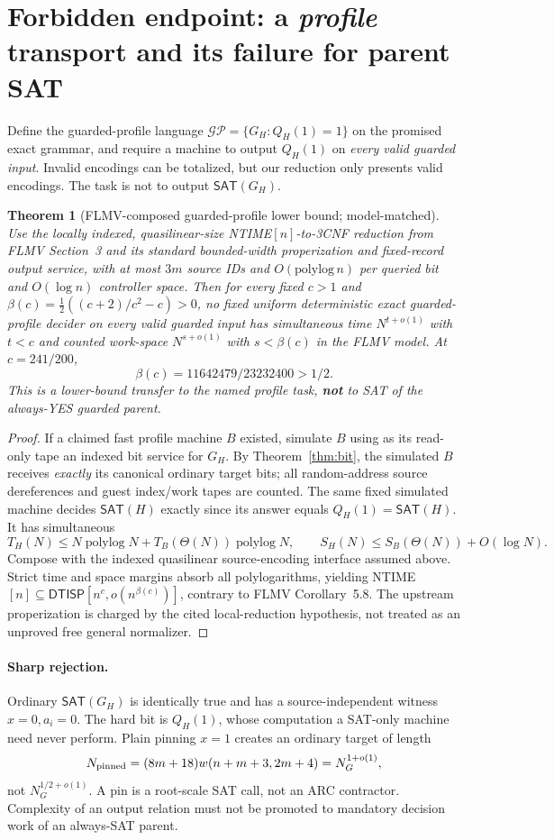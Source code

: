 \documentclass[11pt]{article}
\newtheorem{theorem}{Theorem}
\newcommand{\SAT}{\mathsf{SAT}}
\newcommand{\DTISP}{\mathsf{DTISP}}
\begin{document}
\section{Forbidden endpoint: a \emph{profile} transport and its failure for parent SAT}
Define the guarded-profile language $\mathcal{GP}=\{G_H:Q_H(1)=1\}$ on the promised exact grammar, and require a machine to output $Q_H(1)$ on \emph{every valid guarded input}. Invalid encodings can be totalized, but our reduction only presents valid encodings. The task is not to output $\SAT(G_H)$.
\begin{theorem}[FLMV-composed guarded-profile lower bound; model-matched]\label{thm:flmv}
Use the locally indexed, quasilinear-size NTIME$[n]$-to-3CNF reduction from FLMV Section~3 and its standard bounded-width properization and fixed-record output service, with at most $3m$ source IDs and $O(\mathrm{polylog}\,n)$ per queried bit and $O(\log n)$ controller space. Then for every fixed $c>1$ and $\beta(c)=\frac12((c+2)/c^2-c)>0$, no fixed uniform deterministic exact \emph{guarded-profile} decider on every valid guarded input has simultaneous time $N^{t+o(1)}$ with $t<c$ and counted work-space $N^{s+o(1)}$ with $s<\beta(c)$ in the FLMV model. At $c=241/200$,
\[
\beta(c)=11642479/23232400>1/2.
\]
This is a lower-bound transfer to the named profile task, \textbf{not} to SAT of the always-YES guarded parent.
\end{theorem}
\begin{proof}
If a claimed fast profile machine $B$ existed, simulate $B$ using as its read-only tape an indexed bit service for $G_H$. By Theorem~\ref{thm:bit}, the simulated $B$ receives \emph{exactly} its canonical ordinary target bits; all random-address source dereferences and guest index/work tapes are counted. The same fixed simulated machine decides $\SAT(H)$ exactly since its answer equals $Q_H(1)=\SAT(H)$. It has simultaneous
\[
T_H(N)\le N\operatorname{polylog}N+
T_B(\Theta(N))\operatorname{polylog}N,\qquad
S_H(N)\le S_B(\Theta(N))+O(\log N).
\]
Compose with the indexed quasilinear source-encoding interface assumed above. Strict time and space margins absorb all polylogarithms, yielding NTIME$[n]\subseteq\DTISP[n^c,o(n^{\beta(c)})]$, contrary to FLMV Corollary~5.8. The upstream properization is charged by the cited local-reduction hypothesis, not treated as an unproved free general normalizer.
\end{proof}

\paragraph{Sharp rejection.} Ordinary $\SAT(G_H)$ is identically true and has a source-independent witness $x=0,a_i=0$. The hard bit is $Q_H(1)$, whose computation a SAT-only machine need never perform. Plain pinning $x=1$ creates an ordinary target of length
\[
N_{\rm pinned}=(8m+18)w(n+m+3,2m+4)=N_G^{1+o(1)},
\]
not $N_G^{1/2+o(1)}$. A pin is a root-scale SAT call, not an ARC contractor. Complexity of an output relation must not be promoted to mandatory decision work of an always-SAT parent.
\end{document}
